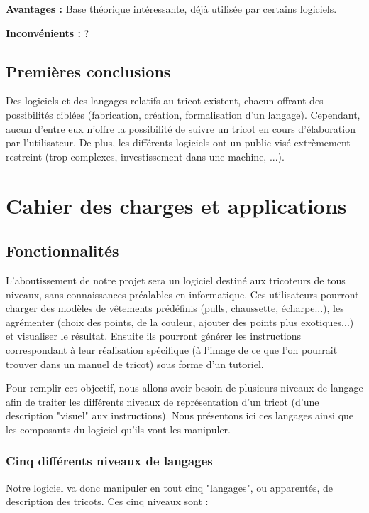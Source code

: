 \documentclass{article}
\begin{document}
\textbf{Avantages : } Base théorique intéressante, déjà utilisée par certains logiciels.

\textbf{Inconvénients : } ? %

\subsection{Premières conclusions}

Des logiciels et des langages relatifs au tricot existent, chacun offrant des possibilités ciblées (fabrication, création, formalisation 
d'un langage). Cependant, aucun d'entre eux n'offre la possibilité de suivre un tricot en cours d'élaboration par l'utilisateur. De plus, 
les différents logiciels ont un public visé extrèmement restreint (trop complexes, investissement dans une machine, ...).

\section{Cahier des charges et applications}

\subsection{Fonctionnalités}

L'aboutissement de notre projet sera un logiciel destiné aux tricoteurs de tous niveaux, sans connaissances préalables en informatique. 
Ces utilisateurs pourront charger des modèles de vêtements prédéfinis (pulls, chaussette, écharpe...), les agrémenter (choix des points, 
de la couleur, ajouter des points plus exotiques...) et visualiser le résultat. Ensuite ils pourront générer les instructions correspondant à leur réalisation 
spécifique (à l'image de ce que l'on pourrait trouver dans un manuel de tricot) sous forme d'un tutoriel.

Pour remplir cet objectif, nous allons avoir besoin de plusieurs niveaux de langage afin de traiter les différents niveaux de 
représentation d'un tricot (d'une description "visuel" aux instructions). Nous présentons ici ces langages ainsi que les composants du 
logiciel qu'ils vont les manipuler.

\subsubsection{Cinq différents niveaux de langages}

Notre logiciel va donc manipuler en tout cinq "langages", ou apparentés, de description des tricots. Ces cinq niveaux sont :
\end{document}
